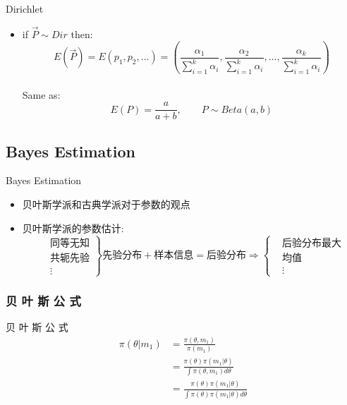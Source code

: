 \documentclass{beamer}
\begin{document}
\begin{CJK*}{UTF8}{gbsn}
\begin{frame}{Dirichlet}
\begin{itemize}
\item {if} $\overrightarrow{P}\sim Dir$ {then:}$$E(\overrightarrow{P})=E(p_1,p_2,\dots)=(\frac{\alpha_1}{\sum_{i=1}^k\alpha_i},\frac{\alpha_2}{\sum_{i=1}^k\alpha_i},\dots,\frac{\alpha_k}{\sum_{i=1}^k\alpha_i})$$\\
{Same as:}$$E(P)=\frac{a}{a+b},\qquad P\sim Beta(a,b)$$
\end{itemize}
\end{frame}




\subsection{Bayes Estimation}
\begin{frame}{Bayes Estimation}
\begin{itemize}
\item 	贝叶斯学派和古典学派对于参数的观点
\item	贝叶斯学派的参数估计:
\[
\left.
\begin{split}
&\text{同等无知}\\
&\text{共轭先验}\\
&\vdots
\end{split}
\right\}  
\text{先验分布}+\text{样本信息}=\text{后验分布}\Rightarrow \left\{
\begin{split}
&\text{后验分布最大}\\
&\text{均值}\\
&\vdots
\end{split}
\right.  
\] 
\end{itemize}
\end{frame}

\subsubsection{贝 叶 斯 公 式}
\begin{frame}{贝 叶 斯 公 式}
\begin{align*}
\pi(\theta|m_1)&=\frac{\pi(\theta,m_1)}{\pi(m_1)}\\
&=\frac{\pi(\theta)\pi(m_1|\theta)}{{\int \pi(\theta,m_1)d\theta}}\\
&=\frac{\pi(\theta)\pi(m_1|\theta)}{\int {\pi(\theta)\pi(m_1|\theta)}d\theta}
\end{align*}
\end{frame}


\end{CJK*}
\end{document}
